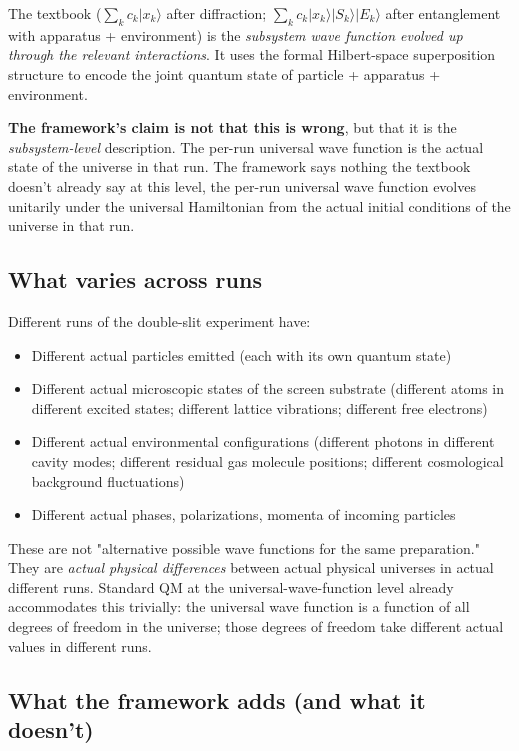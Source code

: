 \documentclass[11pt,a4paper]{article}
\begin{document}
The textbook ($\sum_k c_k |x_k\rangle$ after diffraction; $\sum_k c_k |x_k\rangle|S_k\rangle|E_k\rangle$ after entanglement with apparatus + environment) is the \emph{subsystem wave function evolved up through the relevant interactions}. It uses the formal Hilbert-space superposition structure to encode the joint quantum state of particle + apparatus + environment.

\textbf{The framework's claim is not that this is wrong}, but that it is the \emph{subsystem-level} description. The per-run universal wave function is the actual state of the universe in that run. The framework says nothing the textbook doesn't already say at this level, the per-run universal wave function evolves unitarily under the universal Hamiltonian from the actual initial conditions of the universe in that run.

\subsection{What varies across runs}

Different runs of the double-slit experiment have:

\begin{itemize}
  \item Different actual particles emitted (each with its own quantum state)
  \item Different actual microscopic states of the screen substrate (different atoms in different excited states; different lattice vibrations; different free electrons)
  \item Different actual environmental configurations (different photons in different cavity modes; different residual gas molecule positions; different cosmological background fluctuations)
  \item Different actual phases, polarizations, momenta of incoming particles
\end{itemize}

These are not "alternative possible wave functions for the same preparation." They are \emph{actual physical differences} between actual physical universes in actual different runs. Standard QM at the universal-wave-function level already accommodates this trivially: the universal wave function is a function of all degrees of freedom in the universe; those degrees of freedom take different actual values in different runs.

\subsection{What the framework adds (and what it doesn't)}
\end{document}
